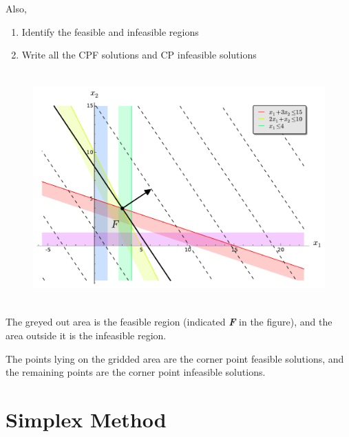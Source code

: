 \documentclass[12pt]{article}
\begin{document}
Also, 
\begin{enumerate}
\item Identify the feasible and infeasible regions
\item Write all the CPF solutions and CP infeasible solutions
\end{enumerate}

\begin{figure}[H]
    \centering
\includegraphics[height=3.5in]{./images/p3_8.pdf}
\end{figure}

The greyed out area is the feasible region (indicated {\bf \emph F} in the figure), and the area outside it is the infeasible region.

The points lying on the gridded area are the corner point feasible solutions, and the remaining points are the 
corner point infeasible solutions. 

\section{Simplex Method}
\subsection{}
\end{document}
